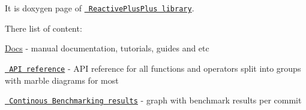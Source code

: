 It is doxygen page of \href{https://github.com/victimsnino/ReactivePlusPlus}{\texttt{ Reactive\+Plus\+Plus library}}.

There list of content\+:


\begin{DoxyItemize}
\item \mbox{\hyperlink{docs}{Docs}} -\/ manual documentation, tutorials, guides and etc
\item \href{https://victimsnino.github.io/ReactivePlusPlus/docs/html/modules.html}{\texttt{ A\+PI reference}} -\/ A\+PI reference for all functions and operators split into groups with marble diagrams for most
\item \href{https://victimsnino.github.io/ReactivePlusPlus/benchmark}{\texttt{ Continous Benchmarking results}} -\/ graph with benchmark results per commit 
\end{DoxyItemize}